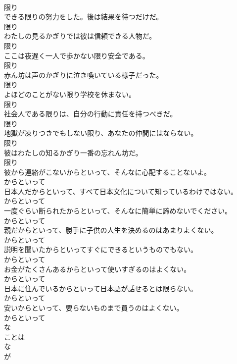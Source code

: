 \documentclass[8pt]{extreport}
\begin{document}
\begin{CJK}{UTF8}{min}
\\	限り	
\\	できる限りの努力をした。後は結果を待つだけだ。	
\\	限り	
\\	わたしの見るかぎりでは彼は信頼できる人物だ。	
\\	限り	
\\	ここは夜遅く一人で歩かない限り安全である。	
\\	限り	
\\	赤ん坊は声のかぎりに泣き喚いている様子だった。	
\\	限り	
\\	よほどのことがない限り学校を休まない。	
\\	限り	
\\	社会人である限りは、自分の行動に責任を持つべきだ。	
\\	限り	
\\	地獄が凍りつきでもしない限り、あなたの仲間にはならない。	
\\	限り	
\\	彼はわたしの知るかぎり一番の忘れん坊だ。	
\\	限り	
\\	彼から連絡がこないからといって、そんなに心配することないよ。	
\\	からといって	
\\	日本人だからといって、すべて日本文化について知っているわけではない。	
\\	からといって	
\\	一度ぐらい断られたからといって、そんなに簡単に諦めないでください。	
\\	からといって	
\\	親だからといって、勝手に子供の人生を決めるのはあまりよくない。	
\\	からといって	
\\	説明を聞いたからといってすぐにできるというものでもない。	
\\	からといって	
\\	お金がたくさんあるからといって使いすぎるのはよくない。	
\\	からといって	
\\	日本に住んでいるからといって日本語が話せるとは限らない。	
\\	からといって	
\\	安いからといって、要らないものまで買うのはよくない。	
\\	からといって	
\\	な
\\	ことは 
\\	な
\\	が	

\end{CJK}
\end{document}
